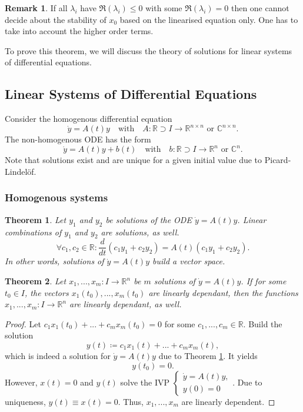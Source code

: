 \documentclass[hidelinks,a4paper, 11pt]{article}
\theoremstyle{plain}
\newtheorem{theorem}{Theorem}
\theoremstyle{break}
\theoremstyle{plain}
\theoremstyle{definition}
\newtheorem*{remark}{Remark}
\begin{document}
\begin{remark}
	If all $\lambda_i$ have $\Re(\lambda_i) \leq 0$ with some $\Re(\lambda_i) = 0$ then one cannot decide about the stability of $x_0$ based on the linearised equation only. One has to take into account the higher order terms.
\end{remark}

To prove this theorem, we will discuss the theory of solutions for linear systems of differential equations.

\subsection{Linear Systems of Differential Equations}
Consider the homogenous differential equation 
\[
\dot y = A(t) y \quad \text{with} \quad A: \mathbb R \supset I \to \mathbb R^{n \times n} \text{ or }\mathbb C^{n \times n}.
\]
The non-homogenous ODE has the form 
\[
	\dot y = A(t) y + b(t) \quad \text{with} \quad b: \mathbb R \supset I \to \mathbb R^n \text{ or } \mathbb C^n.
\]
Note that solutions exist and are unique for a given initial value due to Picard-Lindelöf.

\subsubsection{Homogenous systems}
\begin{theorem}\label{theorem:homosystemvectorspace}
	Let $y_1$ and $y_2$ be solutions of the ODE $\dot y = A(t)y$. Linear combinations of $y_1$ and $y_2$ are solutions, as well.
	\[
		\forall c_1,c_2 \in \mathbb R: \frac{d}{dt}(c_1y_1 + c_2y_2) = A(t)(c_1y_1 + c_2y_2).
	\]
	In other words, solutions of $\dot y = A(t)y$ build a vector space.
\end{theorem}

\begin{theorem}
	Let $x_1,...,x_m: I \to \mathbb R^n$ be $m$ solutions of $\dot y = A(t)y$. If for some $t_0 \in I$, the vectors $x_1(t_0),...,x_m(t_0)$ are linearly dependant, then the functions $x_1,...,x_m: I \to \mathbb R^n$ are linearly dependant, as well.
\end{theorem}

\begin{proof}
	Let $c_1x_1(t_0)+...+c_mx_m(t_0) = 0$ for some $c_1,...,c_m \in \mathbb R$. Build the solution $$y(t) \coloneqq c_1x_1(t) + ... + c_mx_m(t),$$ which is indeed a solution for $\dot y = A(t)y$ due to Theorem \ref{theorem:homosystemvectorspace}. It yields
	\[
		y(t_0) = 0.
	\]
	However, $x(t) = 0$ and $y(t)$ solve the IVP $\begin{cases}\dot y = A(t)y,\\ y(0) = 0\end{cases}$. Due to uniqueness, $y(t) \equiv x(t) = 0$. Thus, $x_1,...,x_m$ are linearly dependent.
\end{proof}
\end{document}
